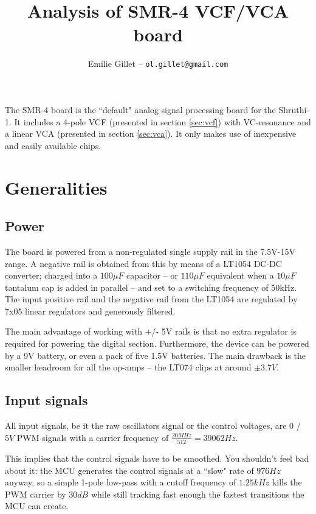 \documentclass[a4paper,11pt]{article}
\title{Analysis of SMR-4 VCF/VCA board}
\author{Emilie Gillet -- \tt ol.gillet@gmail.com}
\date{}
\begin{document}
\maketitle

The SMR-4 board is the ``default" analog signal processing board for the  Shruthi-1. It includes a 4-pole VCF (presented in section \ref{sec:vcf}) with VC-resonance and a linear VCA (presented in section \ref{sec:vca}). It only makes use of inexpensive and easily available chips.

\section{Generalities}

\subsection{Power}

The board is powered from a non-regulated single supply rail in the 7.5V-15V range. A negative rail is obtained from this by means of a LT1054 DC-DC converter; charged into a $100\mu F$ capacitor -- or $110\mu F$ equivalent when a $10\mu F$ tantalum cap is added in parallel -- and set to a switching frequency of 50kHz. The input positive rail and the negative rail from the LT1054 are regulated by 7x05 linear regulators and generously filtered.

The main advantage of working with +/- 5V rails is that no extra regulator is required for powering the digital section. Furthermore, the device can be powered by a 9V battery, or even a pack of five 1.5V batteries. The main drawback is the smaller headroom for all the op-amps -- the LT074 clips at around $\pm 3.7V$.

\subsection{Input signals}

All input signals, be it the raw oscillators signal or the control voltages, are $0$ / $5V$ PWM signals with a carrier frequency of $\frac{20MHz}{512} = 39062 Hz$.

This implies that the control signals have to be smoothed. You shouldn't feel bad about it: the MCU generates the control signals at a ``slow" rate of $976 Hz$ anyway, so a simple 1-pole low-pass with a cutoff frequency of $1.25 kHz$ kills the PWM carrier by $30dB$ while still tracking fast enough the fastest transitions the MCU can create.
\end{document}
